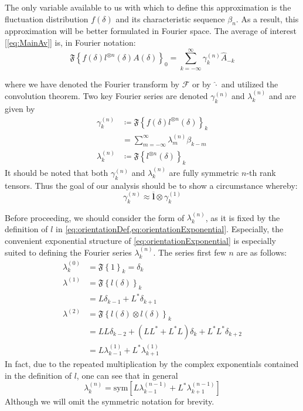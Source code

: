 The only variable available to us with which to define this approximation is the fluctuation distribution \(f(\delta)\) and its characteristic sequence \(\beta_{n}\). As a result, this approximation will be better formulated in Fourier space. The average of interest [\cref{eq:MainAv}] is, in Fourier notation:
\begin{equation}
\mathfrak{F}\left\{ f(\delta)l^{\otimes n}(\delta)A(\delta) \right\}_{0} = \sum_{k = - \infty}^{\infty}{\gamma_{k}^{(n)}{\hat{A}}_{- k}}
\end{equation}

where we have denoted the Fourier transform by \(\mathcal{F}\) or by \(\hat{\cdot}\) and utilized the convolution theorem. Two key
Fourier series are denoted \(\gamma_{k}^{(n)}\) and \(\lambda_{k}^{(n)}\) and are given by 
\begin{align}
\gamma_{k}^{(n)}&\coloneqq\mathfrak{F}\left\{ f(\delta)l^{\otimes n}(\delta) \right\}_{k}\\
&= \sum_{m = - \infty}^{\infty}{\lambda_{m}^{(n)}\beta_{k - m}}\label{eq:gamma_def}\\
\lambda_{k}^{(n)}&\coloneqq\mathfrak{F}\left\{ l^{\otimes n}(\delta) \right\}_{k}
\end{align}
It should be noted that both \(\gamma_{k}^{(n)}\) and \(\lambda_{k}^{(n)}\) are fully symmetric \(n\)-th rank tensors. Thus the goal of our analysis should be to show a circumstance whereby:
\begin{equation}
\gamma_{k}^{(n)} \approx \overline{\boldsymbol{l}} \otimes \gamma_{k}^{(1)}
\end{equation}

Before proceeding, we should consider the form of \(\lambda_{k}^{(n)}\), as it is fixed by the definition of \(l\) in \cref{eq:orientationDef,eq:orientationExponential}. Especially, the convenient exponential structure of \cref{eq:orientationExponential} is especially suited to defining the Fourier series \(\lambda_{k}^{(n)}\). The series first few \(n\) are as follows:
\begin{subequations}
    \begin{align}
\lambda_{k}^{(0)}&=\mathfrak{F}\left\{ 1 \right\}_{k} = \delta_{k}\\
\lambda^{(1)}&=\mathfrak{F}\left\{ l(\delta) \right\}_{k}\\
&= L\delta_{k - 1} + L^{*}\delta_{k + 1}\\
\lambda^{(2)}&=\mathfrak{ F}\left\{ l(\delta) \otimes l(\delta) \right\}_{k}\\
&= LL\delta_{k - 2} + \left( LL^{*} + L^{*}L \right)\delta_{k} + L^{*}L^{*}\delta_{k + 2}\\
&= L\lambda_{k - 1}^{(1)} + L^{*}\lambda_{k + 1}^{(1)}\end{align}
\end{subequations}
In fact, due to the repeated multiplication by the complex exponentials
contained in the definition of \(l\), one can see that in general
\begin{equation}
\lambda_{k}^{(n)} = \text{sym}\left\lbrack L\lambda_{k - 1}^{(n - 1)} + L^{*}\lambda_{k + 1\ }^{(n - 1)} \right\rbrack\end{equation}
Although we will omit the symmetric notation for brevity.

